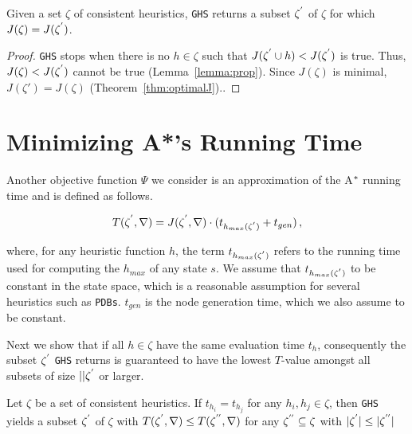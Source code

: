 \begin{theorem}
Given a set $\zeta$ of consistent heuristics, \texttt{GHS} returns a subset $\zeta\sp{'}$ of $\zeta$ for which $J(\zeta) = J(\zeta\sp{'})$. 
\label{thm:optimalJ}
\end{theorem}

\begin{proof}
 \texttt{GHS} stops when there is no $h \in \zeta$ such that $J(\zeta\sp{'} \cup h) < J(\zeta\sp{'})$ is true. Thus, $J(\zeta) < J(\zeta\sp{'})$ cannot be true (Lemma~\ref{lemma:prop}). Since $J(\zeta)$ is minimal, $J(\zeta') = J(\zeta)$  (Theorem~\ref{thm:optimalJ})..
\end{proof}
\fi

\section{Minimizing A*'s Running Time}
\noindent
Another objective function $\Psi$ we consider is an approximation of the A$\sp{*}$ running time and is defined as follows.

\begin{equation}
T(\zeta\sp{'}, \nabla) = J(\zeta\sp{'},\nabla) \cdot (t_{h_{max}(\zeta\sp{'})} + t_{gen})\,, 
\label{eq:eq_time_solving}
\end{equation}
\noindent

where, for any heuristic function $h$, the term $t_{h_{max}(\zeta\sp{'})}$ refers to the running time used for computing the $h_{max}$ of any state $s$. We assume that $t_{h_{max}(\zeta\sp{'})}$ to be constant in the state space, which is a reasonable assumption for several heuristics such as \texttt{PDBs}. $t_{gen}$ is the node generation time, which we also assume to be constant.

\iffalse
Next we show that if all $h \in \zeta$ have the same evaluation time $t_{h}$, consequently the subset $\zeta\sp{'}$ \texttt{GHS} returns is guaranteed to have the lowest $T$-value amongst all subsets of size $||\zeta\sp{'}$ or larger.

\begin{theorem}
Let $\zeta$ be a set of consistent heuristics. If $t_{h_{i}} = t_{h_{j}}$ for any $h_{i}, h_{j} \in \zeta$, then \texttt{GHS} yields a subset $\zeta\sp{'}$ of $\zeta$ with $T(\zeta\sp{'}, \nabla) \leq T(\zeta\sp{''}, \nabla)$ for any $\zeta\sp{''} \subseteq \zeta$ with $|\zeta\sp{'}| \leq |\zeta\sp{''}|$
\label{th:theorem_evaluation_time_heuristic}
\end{theorem} 

